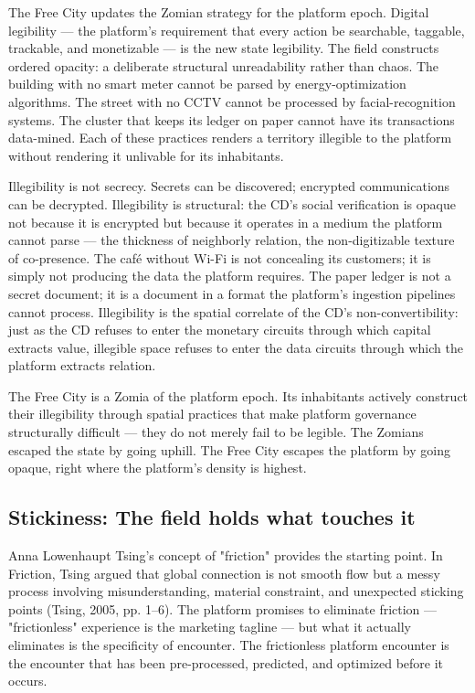 The Free City updates the Zomian strategy for the platform epoch. Digital legibility — the platform's requirement that every action be searchable, taggable, trackable, and monetizable — is the new state legibility. The field constructs ordered opacity: a deliberate structural unreadability rather than chaos. The building with no smart meter cannot be parsed by energy-optimization algorithms. The street with no CCTV cannot be processed by facial-recognition systems. The cluster that keeps its ledger on paper cannot have its transactions data-mined. Each of these practices renders a territory illegible to the platform without rendering it unlivable for its inhabitants.

Illegibility is not secrecy. Secrets can be discovered; encrypted communications can be decrypted. Illegibility is structural: the CD's social verification is opaque not because it is encrypted but because it operates in a medium the platform cannot parse — the thickness of neighborly relation, the non-digitizable texture of co-presence. The café without Wi-Fi is not concealing its customers; it is simply not producing the data the platform requires. The paper ledger is not a secret document; it is a document in a format the platform's ingestion pipelines cannot process. Illegibility is the spatial correlate of the CD's non-convertibility: just as the CD refuses to enter the monetary circuits through which capital extracts value, illegible space refuses to enter the data circuits through which the platform extracts relation.

The Free City is a Zomia of the platform epoch. Its inhabitants actively construct their illegibility through spatial practices that make platform governance structurally difficult — they do not merely fail to be legible. The Zomians escaped the state by going uphill. The Free City escapes the platform by going opaque, right where the platform's density is highest.

\subsection{Stickiness: The field holds what touches it}

Anna Lowenhaupt Tsing's concept of "friction" provides the starting point. In Friction, Tsing argued that global connection is not smooth flow but a messy process involving misunderstanding, material constraint, and unexpected sticking points (Tsing, 2005, pp. 1–6). The platform promises to eliminate friction — "frictionless" experience is the marketing tagline — but what it actually eliminates is the specificity of encounter. The frictionless platform encounter is the encounter that has been pre-processed, predicted, and optimized before it occurs.

